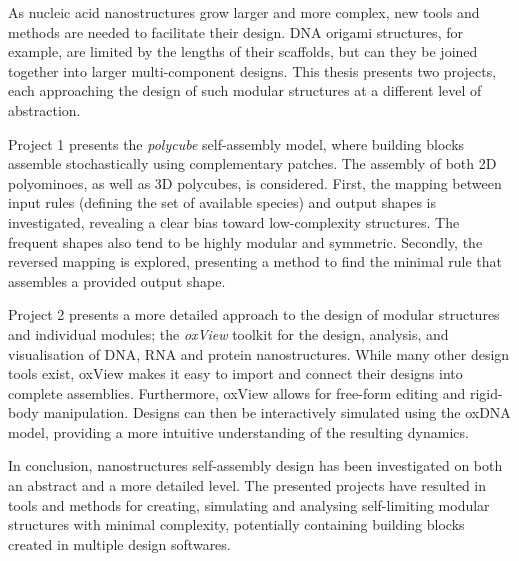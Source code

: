 
As nucleic acid nanostructures grow larger and more complex, new tools and methods are needed to facilitate their design. DNA origami structures, for example, are limited by the lengths of their scaffolds, but can they be joined together into larger multi-component designs. This thesis presents two projects, each approaching the design of such modular structures at a different level of abstraction.

Project 1 presents the \emph{polycube} self-assembly model, where building blocks assemble stochastically using complementary patches. The assembly of both 2D polyominoes, as well as 3D polycubes, is considered. First, the mapping between input rules (defining the set of available species) and output shapes is investigated, revealing a clear bias toward low-complexity structures. The frequent shapes also tend to be highly modular and symmetric. Secondly, the reversed mapping is explored, presenting a method to find the minimal rule that assembles a provided output shape.

Project 2 presents a more detailed approach to the design of modular structures and individual modules; the \emph{oxView} toolkit for the design, analysis, and visualisation of DNA, RNA and protein nanostructures. While many other design tools exist, oxView makes it easy to import and connect their designs into complete assemblies. Furthermore, oxView allows for free-form editing and rigid-body manipulation. Designs can then be interactively simulated using the oxDNA model, providing a more intuitive understanding of the resulting dynamics.

In conclusion, nanostructures self-assembly design has been investigated on both an abstract and a more detailed level. The presented projects have resulted in tools and methods for creating, simulating and analysing self-limiting modular structures with minimal complexity, potentially containing building blocks created in multiple design softwares.